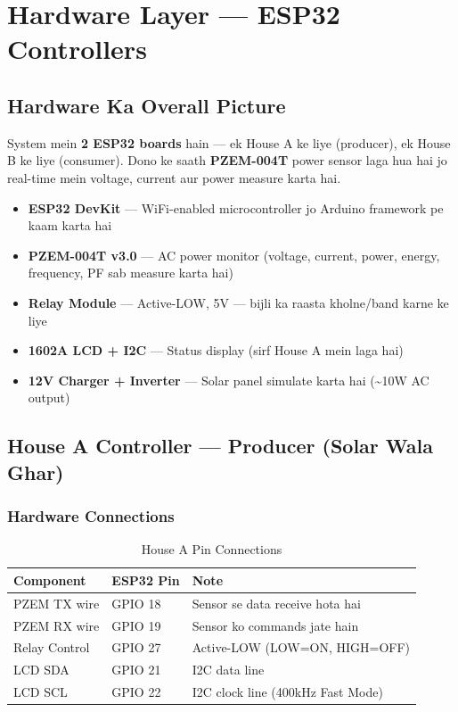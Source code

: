 \chapter{Hardware Layer --- ESP32 Controllers}

\section{Hardware Ka Overall Picture}

System mein \textbf{2 ESP32 boards} hain --- ek House A ke liye (producer), ek House B ke liye (consumer). Dono ke saath \textbf{PZEM-004T} power sensor laga hua hai jo real-time mein voltage, current aur power measure karta hai.

\begin{tipbox}
\begin{itemize}[nosep]
    \item \textbf{ESP32 DevKit} --- WiFi-enabled microcontroller jo Arduino framework pe kaam karta hai
    \item \textbf{PZEM-004T v3.0} --- AC power monitor (voltage, current, power, energy, frequency, PF sab measure karta hai)
    \item \textbf{Relay Module} --- Active-LOW, 5V --- bijli ka raasta kholne/band karne ke liye
    \item \textbf{1602A LCD + I2C} --- Status display (sirf House A mein laga hai)
    \item \textbf{12V Charger + Inverter} --- Solar panel simulate karta hai (\textasciitilde10W AC output)
\end{itemize}
\end{tipbox}

\section{House A Controller --- Producer (Solar Wala Ghar)}

\subsection{Hardware Connections}

\begin{table}[H]
\centering
\begin{tabular}{l l l}
\toprule
\textbf{Component} & \textbf{ESP32 Pin} & \textbf{Note} \\
\midrule
PZEM TX wire & GPIO 18 & Sensor se data receive hota hai \\
PZEM RX wire & GPIO 19 & Sensor ko commands jate hain \\
Relay Control & GPIO 27 & Active-LOW (LOW=ON, HIGH=OFF) \\
LCD SDA & GPIO 21 & I2C data line \\
LCD SCL & GPIO 22 & I2C clock line (400kHz Fast Mode) \\
\bottomrule
\end{tabular}
\caption{House A Pin Connections}
\end{table}

